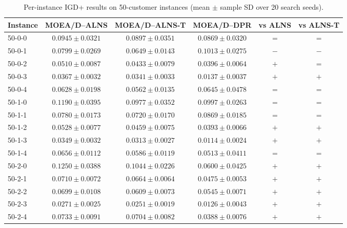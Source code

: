 \begin{table}[t]
\centering
\caption{Per-instance IGD+ results on 50-customer instances (mean $\pm$ sample SD over 20 search seeds).}
\begin{tabular}{lccccc}
\toprule
Instance & MOEA/D--ALNS & MOEA/D--ALNS-T & MOEA/D--DPR & vs ALNS & vs ALNS-T \\
\midrule
50-0-0 & $0.0945 \pm 0.0321$ & $0.0897 \pm 0.0351$ & $\mathbf{0.0869 \pm 0.0320}$ & $=$ & $=$ \\
50-0-1 & $0.0799 \pm 0.0269$ & $\mathbf{0.0649 \pm 0.0143}$ & $0.1013 \pm 0.0275$ & $-$ & $-$ \\
50-0-2 & $0.0510 \pm 0.0087$ & $0.0433 \pm 0.0079$ & $\mathbf{0.0396 \pm 0.0064}$ & $+$ & $=$ \\
50-0-3 & $0.0367 \pm 0.0032$ & $0.0341 \pm 0.0033$ & $\mathbf{0.0137 \pm 0.0037}$ & $+$ & $+$ \\
50-0-4 & $0.0628 \pm 0.0198$ & $\mathbf{0.0562 \pm 0.0135}$ & $0.0645 \pm 0.0478$ & $=$ & $=$ \\
50-1-0 & $0.1190 \pm 0.0395$ & $\mathbf{0.0977 \pm 0.0352}$ & $0.0997 \pm 0.0263$ & $=$ & $=$ \\
50-1-1 & $0.0780 \pm 0.0173$ & $\mathbf{0.0720 \pm 0.0170}$ & $0.0869 \pm 0.0185$ & $=$ & $=$ \\
50-1-2 & $0.0528 \pm 0.0077$ & $0.0459 \pm 0.0075$ & $\mathbf{0.0393 \pm 0.0066}$ & $+$ & $+$ \\
50-1-3 & $0.0349 \pm 0.0032$ & $0.0313 \pm 0.0027$ & $\mathbf{0.0114 \pm 0.0024}$ & $+$ & $+$ \\
50-1-4 & $0.0656 \pm 0.0112$ & $0.0586 \pm 0.0119$ & $\mathbf{0.0513 \pm 0.0411}$ & $=$ & $=$ \\
50-2-0 & $0.1250 \pm 0.0388$ & $0.1044 \pm 0.0226$ & $\mathbf{0.0600 \pm 0.0425}$ & $+$ & $+$ \\
50-2-1 & $0.0710 \pm 0.0072$ & $0.0664 \pm 0.0064$ & $\mathbf{0.0475 \pm 0.0053}$ & $+$ & $+$ \\
50-2-2 & $0.0699 \pm 0.0108$ & $0.0609 \pm 0.0073$ & $\mathbf{0.0545 \pm 0.0071}$ & $+$ & $+$ \\
50-2-3 & $0.0271 \pm 0.0025$ & $0.0251 \pm 0.0019$ & $\mathbf{0.0126 \pm 0.0043}$ & $+$ & $+$ \\
50-2-4 & $0.0733 \pm 0.0091$ & $0.0704 \pm 0.0082$ & $\mathbf{0.0388 \pm 0.0076}$ & $+$ & $+$ \\
\bottomrule
\end{tabular}
\end{table}

